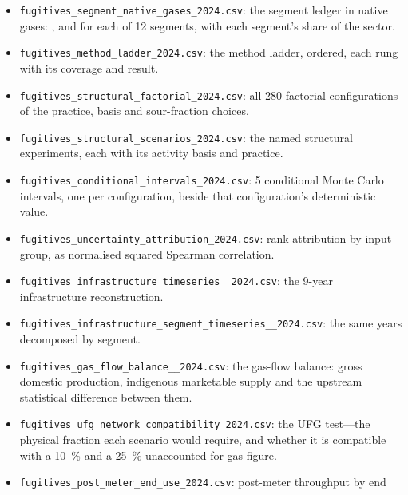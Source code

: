 \begin{itemize}\itemsep2pt
\item \texttt{fugitives\_\allowbreak segment\_\allowbreak native\_\allowbreak gases\_\allowbreak 2024.csv}: the segment ledger in native
  gases: \CHfour{}, \COtwo{} and \NtwoO{} for each of \num{12} segments, with each segment's
  share of the sector.
\item \texttt{fugitives\_method\_ladder\_2024.csv}: the method ladder, ordered, each rung
  with its coverage and result.
\item \texttt{fugitives\_\allowbreak structural\_\allowbreak factorial\_\allowbreak 2024.csv}: all \num{280} factorial
  configurations of the practice, basis and sour-fraction choices.
\item \texttt{fugitives\_\allowbreak structural\_\allowbreak scenarios\_\allowbreak 2024.csv}: the named structural
  experiments, each with its activity basis and practice.
\item \texttt{fugitives\_\allowbreak conditional\_\allowbreak intervals\_\allowbreak 2024.csv}: \num{5} conditional Monte
  Carlo intervals, one per configuration, beside that configuration's deterministic value.
\item \texttt{fugitives\_\allowbreak uncertainty\_\allowbreak attribution\_\allowbreak 2024.csv}: rank attribution by input
  group, as normalised squared Spearman correlation.
\item \texttt{fugitives\_\allowbreak infrastructure\_\allowbreak timeseries\_\_\allowbreak 2024.csv}: the \num{9}-year
  infrastructure reconstruction.
\item \texttt{fugitives\_\allowbreak infrastructure\_\allowbreak segment\_\allowbreak timeseries\_\_\allowbreak 2024.csv}: the same
  years decomposed by segment.
\item \texttt{fugitives\_\allowbreak gas\_\allowbreak flow\_\allowbreak balance\_\_\allowbreak 2024.csv}: the gas-flow balance: gross
  domestic production, indigenous marketable supply and the upstream statistical difference
  between them.
\item \texttt{fugitives\_\allowbreak ufg\_\allowbreak network\_\allowbreak compatibility\_\allowbreak 2024.csv}: the UFG test---the
  physical fraction each scenario would require, and whether it is compatible with a
  \SI{10}{\percent} and a \SI{25}{\percent} unaccounted-for-gas figure.
\item \texttt{fugitives\_\allowbreak post\_\allowbreak meter\_\allowbreak end\_\allowbreak use\_\allowbreak 2024.csv}: post-meter throughput by end

\end{itemize}

